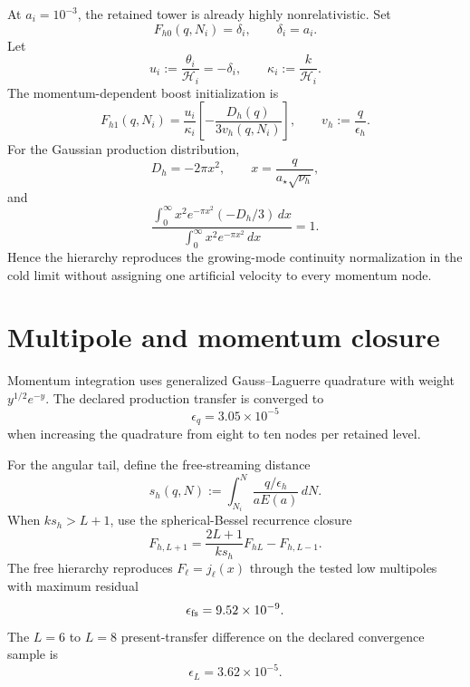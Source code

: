 At $a_i=10^{-3}$, the retained tower is already highly nonrelativistic.  Set
\begin{equation}
 F_{h0}(q,N_i)=\delta_i,
 \qquad
 \delta_i=a_i.
 \label{eq:cb-initial-monopole}
\end{equation}
Let
\begin{equation}
 u_i:=\frac{\theta_i}{\mathcal H_i}=-\delta_i,
 \qquad
 \kappa_i:=\frac{k}{\mathcal H_i}.
 \label{eq:cb-initial-velocity}
\end{equation}
The momentum-dependent boost initialization is
\begin{equation}
 F_{h1}(q,N_i)
 =\frac{u_i}{\kappa_i}
 \left[-\frac{D_h(q)}{3v_h(q,N_i)}\right],
 \qquad
 v_h:=\frac{q}{\epsilon_h}.
 \label{eq:cb-initial-dipole}
\end{equation}
For the Gaussian production distribution,
\begin{equation}
 D_h=-2\pi x^2,
 \qquad
 x=\frac{q}{a_\star\sqrt{\nu_h}},
 \label{eq:cb-gaussian-derivative}
\end{equation}
and
\begin{equation}
 \frac{
 \int_0^\infty x^2e^{-\pi x^2}(-D_h/3)\,dx
 }{
 \int_0^\infty x^2e^{-\pi x^2}\,dx
 }
 =1.
 \label{eq:cb-boost-identity}
\end{equation}
Hence the hierarchy reproduces the growing-mode continuity normalization in the cold limit without assigning one artificial velocity to every momentum node.

\section{Multipole and momentum closure}

Momentum integration uses generalized Gauss--Laguerre quadrature with weight $y^{1/2}e^{-y}$.  The declared production transfer is converged to
\begin{equation}
 \epsilon_q=3.05\times10^{-5}
 \label{eq:cb-quadrature-residual}
\end{equation}
when increasing the quadrature from eight to ten nodes per retained level.

For the angular tail, define the free-streaming distance
\begin{equation}
 s_h(q,N)
 :=\int_{N_i}^{N}
 \frac{q/\epsilon_h}{aE(a)}\,dN.
 \label{eq:cb-stream-distance}
\end{equation}
When $ks_h>L+1$, use the spherical-Bessel recurrence closure
\begin{equation}
 F_{h,L+1}
 =\frac{2L+1}{ks_h}F_{hL}-F_{h,L-1}.
 \label{eq:cb-recurrence-closure}
\end{equation}
The free hierarchy reproduces $F_\ell=j_\ell(x)$ through the tested low multipoles with maximum residual
\begin{equation}
 \epsilon_{\rm fs}=9.52\times10^{-9}.
 \label{eq:cb-free-streaming-residual}
\end{equation}
The $L=6$ to $L=8$ present-transfer difference on the declared convergence sample is
\begin{equation}
 \epsilon_L=3.62\times10^{-5}.
 \label{eq:cb-ell-residual}
\end{equation}

